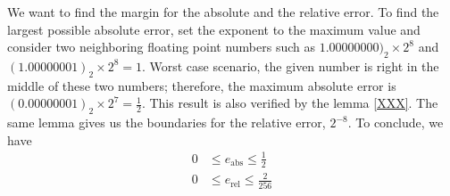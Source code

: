 %
%
\begin{exmp}
    We want to find the margin for the absolute and the relative error. To find the largest possible absolute error, set the exponent to the maximum value and consider two neighboring floating point numbers such as \(1.00000000)_2 \times 2^8\) and \((1.00000001)_2 \times 2^8 = 1\). Worst case scenario, the given number is right in the middle of these two numbers; therefore, the maximum absolute error is \((0.00000001)_2 \times 2^7 = \frac{1}{2}\). This result is also verified by the lemma \ref{XXX}. The same lemma gives us the boundaries for the relative error, \(2^{-8}\). To conclude, we have
    \begin{align*}
        0 &\leq e_\text{abs} \leq \frac{1}{2} \\
        0 &\leq e_\text{rel} \leq \frac{2}{256}
    \end{align*}
\end{exmp}
%
%
%
